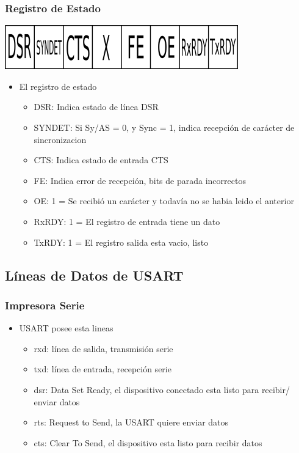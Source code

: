 \documentclass{beamer}
\begin{document}
\begin{frame}
\frametitle{Registro de Estado}
\begin{center}
 \includegraphics[scale=0.50]{usart-estado.png}
\end{center}
\begin{itemize}
 \item El registro de estado 
 \begin{itemize}
   \item DSR: Indica estado de línea DSR
   \item SYNDET: Si Sy/AS = 0, y Sync = 1, indica recepción de carácter de sincronizacion
   \item CTS: Indica estado de entrada CTS
   \item FE: Indica error de recepción, bits de parada incorrectos
   \item OE: 1 = Se recibió un carácter y todavía no se habia leido el anterior 
   \item RxRDY: 1 = El registro de entrada tiene un dato
   \item TxRDY: 1 = El registro salida esta vacio, listo
   \end{itemize}
\end{itemize}
\end{frame}

\subsection{Líneas de Datos de USART}
\begin{frame}[fragile]
\frametitle{Impresora Serie}
\begin{itemize}
 \item USART posee esta lineas
 \begin{itemize}
  \item rxd: línea de salida, transmisión serie 
  \item txd: línea de entrada, recepción serie
  \item dsr: Data Set Ready, el dispositivo conectado esta listo para recibir/ enviar datos
  \item rts: Request to Send, la USART quiere enviar datos
  \item cts: Clear To Send, el dispositivo esta listo para recibir datos
 \end{itemize}
\end{itemize}
\end{frame}
\end{document}
